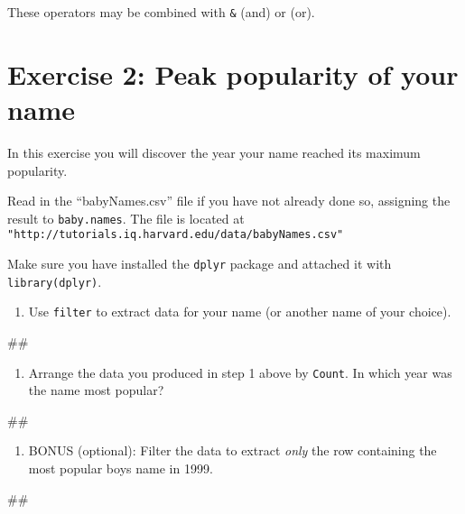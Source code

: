 \documentclass[]{book}
\newenvironment{Shaded}{\begin{snugshade}}{\end{snugshade}}
\newcommand{\NormalTok}[1]{#1}
\providecommand{\tightlist}{%
  \setlength{\itemsep}{0pt}\setlength{\parskip}{0pt}}
\begin{document}
These operators may be combined with \texttt{\&} (and) or
\texttt{\textbar{}} (or).

\section{Exercise 2: Peak popularity of your
name}\label{exercise-2-peak-popularity-of-your-name}

In this exercise you will discover the year your name reached its
maximum popularity.

Read in the ``babyNames.csv'' file if you have not already done so,
assigning the result to \texttt{baby.names}. The file is located at
\texttt{"http://tutorials.iq.harvard.edu/data/babyNames.csv"}

Make sure you have installed the \texttt{dplyr} package and attached it
with \texttt{library(dplyr)}.

\begin{enumerate}
\def\labelenumi{\arabic{enumi}.}
\tightlist
\item
  Use \texttt{filter} to extract data for your name (or another name of
  your choice).
\end{enumerate}

\begin{Shaded}
\begin{Highlighting}[]
\NormalTok{##}
\end{Highlighting}
\end{Shaded}

\begin{enumerate}
\def\labelenumi{\arabic{enumi}.}
\setcounter{enumi}{1}
\tightlist
\item
  Arrange the data you produced in step 1 above by \texttt{Count}. In
  which year was the name most popular?
\end{enumerate}

\begin{Shaded}
\begin{Highlighting}[]
\NormalTok{##}
\end{Highlighting}
\end{Shaded}

\begin{enumerate}
\def\labelenumi{\arabic{enumi}.}
\setcounter{enumi}{2}
\tightlist
\item
  BONUS (optional): Filter the data to extract \emph{only} the row
  containing the most popular boys name in 1999.
\end{enumerate}

\begin{Shaded}
\begin{Highlighting}[]
\NormalTok{##}
\end{Highlighting}
\end{Shaded}
\end{document}
